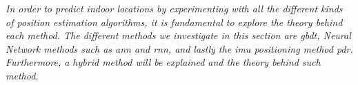 \textit{In order to predict indoor locations by experimenting with all the different kinds of position estimation algorithms, it is fundamental to explore the theory behind each method. The different methods we investigate in this section are \gls{gbdt}, Neural Network methods such as \gls{ann} and \gls{rnn}, and lastly the \gls{imu} positioning method \gls{pdr}. Furthermore, a hybrid method will be explained and the theory behind such method.}